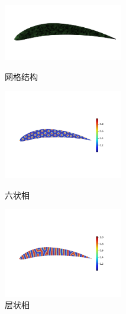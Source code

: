 \documentclass[12pt]{article}
\begin{document}
\begin{CJK}{UTF8}{gkai}
    \begin{figure}[H]
    	\setlength{\abovecaptionskip}{0.cm}
    	\setlength{\belowcaptionskip}{-0.cm}
    	\begin{minipage}[!htbp]{0.3\linewidth}
    		\includegraphics[width=5.2cm]{air_c.png}
    		\caption*{网格结构}
    	\end{minipage}
    	\hspace{0.23in}
    	\begin{minipage}[!htbp]{0.3\linewidth}
    		\includegraphics[width=5.2cm]{scftfigure6720.png}
    		\caption*{六状相}
    	\end{minipage}
    	\hspace{0.23in}
    	\begin{minipage}[!htbp]{0.3\linewidth}
    		\includegraphics[width=5.2cm]{scftfigure260.png}
    		\caption*{层状相}
    	\end{minipage}
    \end{figure}    
    
\end{CJK}
\end{document}
